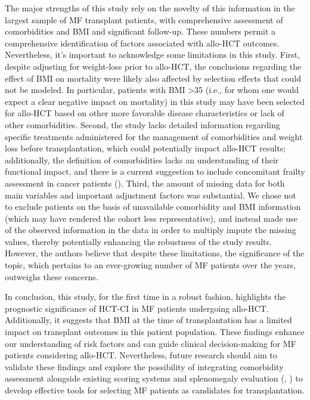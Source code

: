 \documentclass[
  letterpaper,
  DIV=11,
  numbers=noendperiod]{scrreprt}
\begin{document}
The major strengths of this study rely on the novelty of this
information in the largest sample of MF transplant patients, with
comprehensive assessment of comorbidities and BMI and significant
follow-up. These numbers permit a comprehensive identification of
factors associated with allo-HCT outcomes. Nevertheless, it's important
to acknowledge some limitations in this study. First, despite adjusting
for weight-loss prior to allo-HCT, the conclusions regarding the effect
of BMI on mortality were likely also affected by selection effects that
could not be modeled. In particular, patients with BMI \textgreater35
(i.e., for whom one would expect a clear negative impact on mortality)
in this study may have been selected for allo-HCT based on other more
favorable disease characteristics or lack of other comorbidities.
Second, the study lacks detailed information regarding specific
treatments administered for the management of comorbidities and weight
loss before transplantation, which could potentially impact allo-HCT
results; additionally, the definition of comorbidities lacks an
understanding of their functional impact, and there is a current
suggestion to include concomitant frailty assessment in cancer patients
(). Third, the amount of missing data for both main
variables and important adjustment factors was substantial. We chose not
to exclude patients on the basis of unavailable comorbidity and BMI
information (which may have rendered the cohort less representative),
and instead made use of the observed information in the data in order to
multiply impute the missing values, thereby potentially enhancing the
robustness of the study results. However, the authors believe that
despite these limitations, the significance of the topic, which pertains
to an ever-growing number of MF patients over the years, outweighs these
concerns.

In conclusion, this study, for the first time in a robust fashion,
highlights the prognostic significance of HCT-CI in MF patients
undergoing allo-HCT. Additionally, it suggests that BMI at the time of
transplantation has a limited impact on transplant outcomes in this
patient population. These findings enhance our understanding of risk
factors and can guide clinical decision-making for MF patients
considering allo-HCT. Nevertheless, future research should aim to
validate these findings and explore the possibility of integrating
comorbidity assessment alongside existing scoring systems and
splenomegaly evaluation
(,
) to
develop effective tools for selecting MF patients as candidates for
transplantation.
\end{document}
